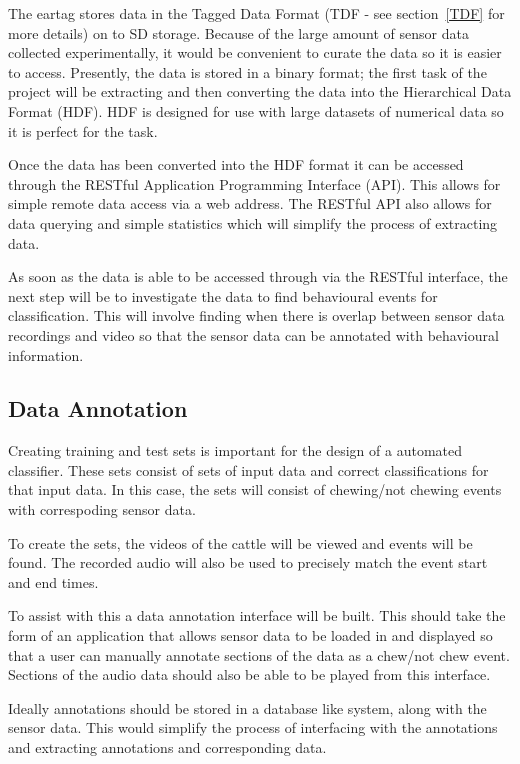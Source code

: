 The eartag stores data in the Tagged Data Format (TDF - see section~\ref{TDF} for more details) on to SD storage. Because of the large amount of sensor data collected experimentally, it would be convenient to curate the data so it is easier to access. Presently, the data is stored in a binary format; the first task of the project will be extracting and then converting the data into the Hierarchical Data Format (HDF). HDF is designed for use with large datasets of numerical data so it is perfect for the task.

Once the data has been converted into the HDF format it can be accessed through the RESTful Application Programming Interface (API). This allows for simple remote data access via a web address. The RESTful API also allows for data querying and simple statistics which will simplify the process of extracting data.

As soon as the data is able to be accessed through via the RESTful interface, the next step will be to investigate the data to find behavioural events for classification. This will involve finding when there is overlap between sensor data recordings and video so that the sensor data can be annotated with behavioural information.

\subsection*{Data Annotation}

Creating training and test sets is important for the design of a automated classifier. These sets consist of sets of input data and correct classifications for that input data. In this case, the sets will consist of chewing/not chewing events with correspoding sensor data. 

To create the sets, the videos of the cattle will be viewed and events will be found. The recorded audio will also be used to precisely match the event start and end times.  

To assist with this a data annotation interface  will be built. This should take the form of an application that allows sensor data to be loaded in and displayed so that a user can manually annotate sections of the data as a chew/not chew event. Sections of the audio data should also be able to be played from this interface. 

Ideally annotations should be stored in a database like system, along with the sensor data. This would simplify the process of interfacing with the annotations and extracting annotations and corresponding data. 


